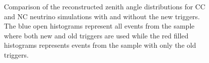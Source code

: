\begin{figure}[h!]
  \centering
  \hfill
  \caption{Comparison of the reconstructed zenith angle distributions for CC and NC neutrino simulations with and without the new triggers. The blue open histograms represent all events from the sample where both new and old triggers are used while the red filled histograms represents events from the sample with only the old triggers.} 
  \label{fig:Rec_Theta_comp}
\end{figure}

